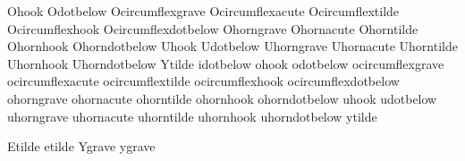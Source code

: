    Ohook                {}
   Odotbelow            {}
   Ocircumflexgrave     {}
   Ocircumflexacute     {}
   Ocircumflextilde     {}
   Ocircumflexhook      {}
   Ocircumflexdotbelow  {}
   Ohorngrave           {}
   Ohornacute           {}
   Ohorntilde           {}
   Ohornhook            {}
   Ohorndotbelow        {}
   Uhook                {}
   Udotbelow            {}
   Uhorngrave           {}
   Uhornacute           {}
   Uhorntilde           {}
   Uhornhook            {}
   Uhorndotbelow        {}
   Ytilde               {}
   idotbelow            {}
   ohook                {}
   odotbelow            {}
   ocircumflexgrave     {}
   ocircumflexacute     {}
   ocircumflextilde     {}
   ocircumflexhook      {}
   ocircumflexdotbelow  {}
   ohorngrave           {}
   ohornacute           {}
   ohorntilde           {}
   ohornhook            {}
   ohorndotbelow        {}
   uhook                {}
   udotbelow            {}
   uhorngrave           {}
   uhornacute           {}
   uhorntilde           {}
   uhornhook            {}
   uhorndotbelow        {}
   ytilde               {}

   Etilde               {}
   etilde               {}
   Ygrave               {}
   ygrave               {}

